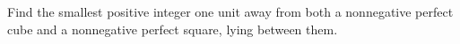 Find the smallest positive integer one unit away from both a nonnegative perfect cube and a nonnegative perfect square, lying between them.
